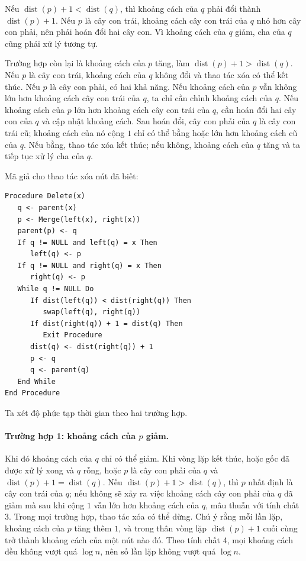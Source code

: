 \documentclass[11pt]{article}
\begin{document}
Nếu \(\operatorname{dist}(p)+1<\operatorname{dist}(q)\), thì khoảng cách của
\(q\) phải đổi thành \(\operatorname{dist}(p)+1\). Nếu \(p\) là cây con trái,
khoảng cách cây con trái của \(q\) nhỏ hơn cây con phải, nên phải hoán đổi hai
cây con. Vì khoảng cách của \(q\) giảm, cha của \(q\) cũng phải xử lý tương tự.

Trường hợp còn lại là khoảng cách của \(p\) tăng, làm
\(\operatorname{dist}(p)+1>\operatorname{dist}(q)\). Nếu \(p\) là cây con trái,
khoảng cách của \(q\) không đổi và thao tác xóa có thể kết thúc. Nếu \(p\) là
cây con phải, có hai khả năng. Nếu khoảng cách của \(p\) vẫn không lớn hơn
khoảng cách cây con trái của \(q\), ta chỉ cần chỉnh khoảng cách của \(q\). Nếu
khoảng cách của \(p\) lớn hơn khoảng cách cây con trái của \(q\), cần hoán đổi
hai cây con của \(q\) và cập nhật khoảng cách. Sau hoán đổi, cây con phải của
\(q\) là cây con trái cũ; khoảng cách của nó cộng \(1\) chỉ có thể bằng hoặc lớn
hơn khoảng cách cũ của \(q\). Nếu bằng, thao tác xóa kết thúc; nếu không, khoảng
cách của \(q\) tăng và ta tiếp tục xử lý cha của \(q\).

Mã giả cho thao tác xóa nút đã biết:

\begin{verbatim}
Procedure Delete(x)
   q <- parent(x)
   p <- Merge(left(x), right(x))
   parent(p) <- q
   If q != NULL and left(q) = x Then
      left(q) <- p
   If q != NULL and right(q) = x Then
      right(q) <- p
   While q != NULL Do
      If dist(left(q)) < dist(right(q)) Then
         swap(left(q), right(q))
      If dist(right(q)) + 1 = dist(q) Then
         Exit Procedure
      dist(q) <- dist(right(q)) + 1
      p <- q
      q <- parent(q)
   End While
End Procedure
\end{verbatim}

Ta xét độ phức tạp thời gian theo hai trường hợp.

\paragraph{Trường hợp 1: khoảng cách của \(p\) giảm.}
Khi đó khoảng cách của \(q\) chỉ có thể giảm. Khi vòng lặp kết thúc, hoặc gốc đã
được xử lý xong và \(q\) rỗng, hoặc \(p\) là cây con phải của \(q\) và
\(\operatorname{dist}(p)+1=\operatorname{dist}(q)\). Nếu
\(\operatorname{dist}(p)+1>\operatorname{dist}(q)\), thì \(p\) nhất định là cây
con trái của \(q\); nếu không sẽ xảy ra việc khoảng cách cây con phải của \(q\)
đã giảm mà sau khi cộng \(1\) vẫn lớn hơn khoảng cách của \(q\), mâu thuẫn với
tính chất 3. Trong mọi trường hợp, thao tác xóa có thể dừng. Chú ý rằng mỗi lần
lặp, khoảng cách của \(p\) tăng thêm \(1\), và trong thân vòng lặp
\(\operatorname{dist}(p)+1\) cuối cùng trở thành khoảng cách của một nút nào đó.
Theo tính chất 4, mọi khoảng cách đều không vượt quá \(\log n\), nên số lần lặp
không vượt quá \(\log n\).
\end{document}
